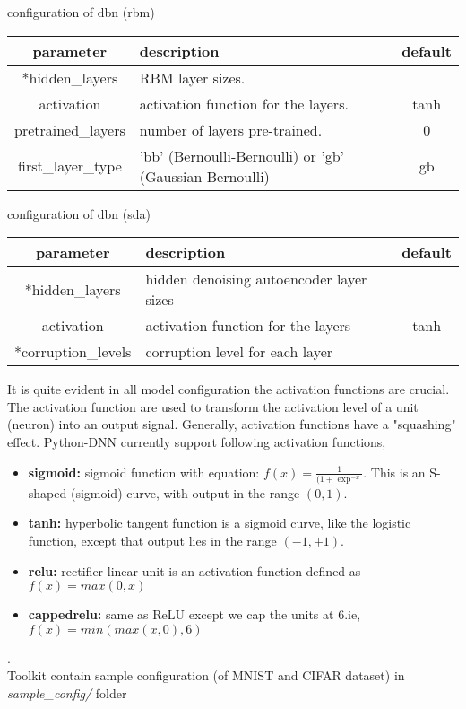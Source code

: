 \begin{table}[!htbp] 
 \begin{center}
  	\medskip  \small configuration of dbn (rbm)
	\begin{tabular}{|c|p{8cm}|c|} \hline
   	\textbf{parameter} & \textbf{description} & \textbf{default}\\  \hline
	*hidden\_layers &  RBM layer sizes. & \\ \hline
	activation & activation function for the layers. & tanh \\ \hline
	pretrained\_layers & number of layers  pre-trained. & 0 \\ \hline
	first\_layer\_type & 'bb' (Bernoulli-Bernoulli) or 'gb' (Gaussian-Bernoulli) & gb  \\ 	\hline 
	\end{tabular}		
\end{center}
\end{table} 
\begin{table}[!htbp] 
 \begin{center}
  	\medskip  \small configuration of dbn (sda)
	\begin{tabular}{|c|p{8cm}|c|} \hline
   	\textbf{parameter} & \textbf{description} & \textbf{default}\\  \hline
	*hidden\_layers &  hidden denoising autoencoder layer sizes & \\ \hline
	activation & activation function for the layers & tanh \\ \hline
	*corruption\_levels & corruption level for each layer &  \\ \hline
	\end{tabular}		
\end{center} 
\end{table} 
\noindent It is quite evident in all model configuration the activation functions are crucial. The activation function are used to transform the activation level of a unit (neuron) into an output signal. Generally, activation functions have a "squashing" effect. Python-DNN currently support following activation functions,
\begin{itemize}
\item {\textbf{sigmoid:} sigmoid function with equation: $f(x) = \frac{1}{(1 + \exp^{-x}}$. This is an S-shaped (sigmoid) curve, with output in the range $(0,1)$.}
\item {\textbf{tanh:} hyperbolic tangent function is a sigmoid curve, like the logistic function, except that output lies in the range $(-1,+1)$.} 
\item {\textbf{relu:} rectifier linear unit is an activation function defined as $f(x) = max(0, x)$}
\item {\textbf{cappedrelu:} same as ReLU except we cap the units at 6.ie, $f(x) = min(max(x,0),6)$}
\end{itemize}
.\\
Toolkit contain sample configuration (of MNIST and CIFAR dataset) in \textit{sample\_config/} folder
\clearpage

